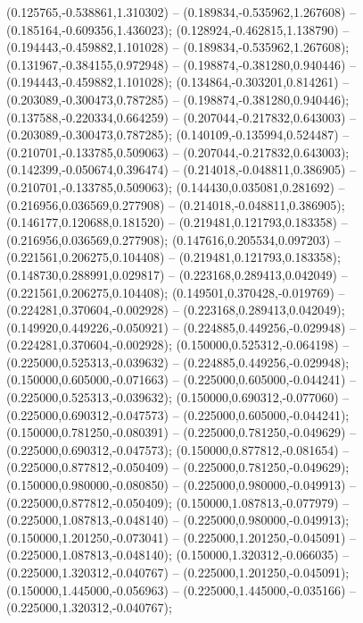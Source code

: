  (0.125765,-0.538861,1.310302) -- (0.189834,-0.535962,1.267608) -- (0.185164,-0.609356,1.436023);
 (0.128924,-0.462815,1.138790) -- (0.194443,-0.459882,1.101028) -- (0.189834,-0.535962,1.267608);
 (0.131967,-0.384155,0.972948) -- (0.198874,-0.381280,0.940446) -- (0.194443,-0.459882,1.101028);
 (0.134864,-0.303201,0.814261) -- (0.203089,-0.300473,0.787285) -- (0.198874,-0.381280,0.940446);
 (0.137588,-0.220334,0.664259) -- (0.207044,-0.217832,0.643003) -- (0.203089,-0.300473,0.787285);
 (0.140109,-0.135994,0.524487) -- (0.210701,-0.133785,0.509063) -- (0.207044,-0.217832,0.643003);
 (0.142399,-0.050674,0.396474) -- (0.214018,-0.048811,0.386905) -- (0.210701,-0.133785,0.509063);
 (0.144430,0.035081,0.281692) -- (0.216956,0.036569,0.277908) -- (0.214018,-0.048811,0.386905);
 (0.146177,0.120688,0.181520) -- (0.219481,0.121793,0.183358) -- (0.216956,0.036569,0.277908);
 (0.147616,0.205534,0.097203) -- (0.221561,0.206275,0.104408) -- (0.219481,0.121793,0.183358);
 (0.148730,0.288991,0.029817) -- (0.223168,0.289413,0.042049) -- (0.221561,0.206275,0.104408);
 (0.149501,0.370428,-0.019769) -- (0.224281,0.370604,-0.002928) -- (0.223168,0.289413,0.042049);
 (0.149920,0.449226,-0.050921) -- (0.224885,0.449256,-0.029948) -- (0.224281,0.370604,-0.002928);
 (0.150000,0.525312,-0.064198) -- (0.225000,0.525313,-0.039632) -- (0.224885,0.449256,-0.029948);
 (0.150000,0.605000,-0.071663) -- (0.225000,0.605000,-0.044241) -- (0.225000,0.525313,-0.039632);
 (0.150000,0.690312,-0.077060) -- (0.225000,0.690312,-0.047573) -- (0.225000,0.605000,-0.044241);
 (0.150000,0.781250,-0.080391) -- (0.225000,0.781250,-0.049629) -- (0.225000,0.690312,-0.047573);
 (0.150000,0.877812,-0.081654) -- (0.225000,0.877812,-0.050409) -- (0.225000,0.781250,-0.049629);
 (0.150000,0.980000,-0.080850) -- (0.225000,0.980000,-0.049913) -- (0.225000,0.877812,-0.050409);
 (0.150000,1.087813,-0.077979) -- (0.225000,1.087813,-0.048140) -- (0.225000,0.980000,-0.049913);
 (0.150000,1.201250,-0.073041) -- (0.225000,1.201250,-0.045091) -- (0.225000,1.087813,-0.048140);
 (0.150000,1.320312,-0.066035) -- (0.225000,1.320312,-0.040767) -- (0.225000,1.201250,-0.045091);
 (0.150000,1.445000,-0.056963) -- (0.225000,1.445000,-0.035166) -- (0.225000,1.320312,-0.040767);
